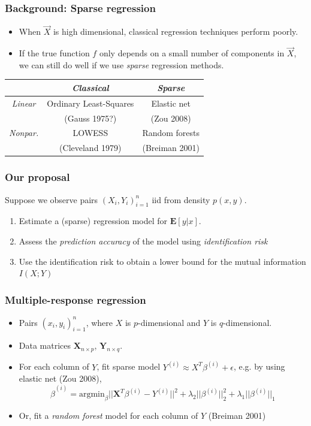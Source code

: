 \documentclass{beamer}
\newcommand{\E}{\textbf{E}}
\newcommand{\bX}{\boldsymbol{X}}
\newcommand{\bY}{\boldsymbol{Y}}
\begin{document}
\begin{frame}
\frametitle{Background: Sparse regression}
\begin{itemize}
\item When $\vec{X}$ is high dimensional, classical regression techniques perform poorly.\pause
\item If the true function $f$ only depends on a small number of components in $\vec{X}$, we can still do well if we use \emph{sparse} regression methods.\pause
\end{itemize}
\begin{center}
\begin{tabular}{c|c|c|}
 & \emph{Classical} & \emph{Sparse} \\ \hline
 \emph{Linear} & Ordinary Least-Squares  & Elastic net \\ 
  & (Gauss 1975?) & (Zou 2008)  \\\hline
 \emph{Nonpar.} & LOWESS  & Random forests  \\ 
   & (Cleveland 1979) & (Breiman 2001)  \\\hline
\end{tabular}
\end{center}
\end{frame}

\begin{frame}
\frametitle{Our proposal}
Suppose we observe pairs $(X_i,Y_i)_{i=1}^n$ iid from density $p(x, y)$.
\begin{enumerate}
\item Estimate a (sparse) regression model for $\E[y|x]$.
\item Assess the \emph{prediction accuracy} of the model using \emph{identification risk}
\item Use the identification risk to obtain a lower bound for the mutual information $I(X; Y)$
\end{enumerate}
\end{frame}

\begin{frame}
\frametitle{Multiple-response regression}
\begin{itemize}
\item Pairs $(x_i,y_i)_{i=1}^n$, where $X$ is $p$-dimensional and $Y$ is $q$-dimensional.
\item Data matrices $\bX_{n \times p}$, $\bY_{n \times q}$.
\item For each column of $Y$, fit sparse model $Y^{(i)} \approx X^T \beta^{(i)}  + \epsilon$, e.g. by using elastic net (Zou 2008), 
\[
\hat{\beta}^{(i)} = \text{argmin}_\beta ||\bX^T \beta^{(i)} - Y^{(i)}||^2 + \lambda_2 ||\beta^{(i)}||_2^2 + \lambda_1 ||\beta^{(i)}||_1
\]
\item Or, fit a \emph{random forest} model for each column of $Y$ (Breiman 2001)
\end{itemize}
\end{frame}
\end{document}
